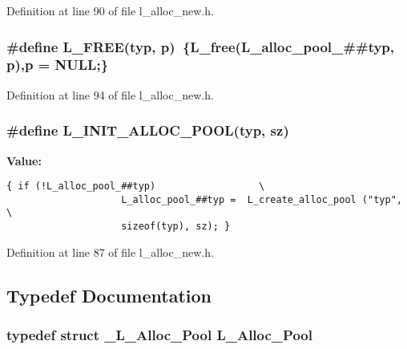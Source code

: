 Definition at line 90 of file l\_\-alloc\_\-new.h.
\subsubsection{\setlength{\rightskip}{0pt plus 5cm}\#define L\_\-FREE(typ, p)~\{L\_\-free(L\_\-alloc\_\-pool\_\-\#\#typ, p),p = NULL;\}}\label{l__alloc__new_8h_4cf4ac7e89ec7a9860e5d0a0a14edae9}




Definition at line 94 of file l\_\-alloc\_\-new.h.
\subsubsection{\setlength{\rightskip}{0pt plus 5cm}\#define L\_\-INIT\_\-ALLOC\_\-POOL(typ, sz)}\label{l__alloc__new_8h_8ad2c6e782598309e0d4b4d4f730d9a8}


\textbf{Value:}

\begin{Code}\begin{verbatim}{ if (!L_alloc_pool_##typ)                  \
                    L_alloc_pool_##typ =  L_create_alloc_pool ("typ",         \
                    sizeof(typ), sz); }
\end{verbatim}\end{Code}


Definition at line 87 of file l\_\-alloc\_\-new.h.

\subsection{Typedef Documentation}
\subsubsection{\setlength{\rightskip}{0pt plus 5cm}typedef struct \bf{\_\-L\_\-Alloc\_\-Pool}
 \bf{L\_\-Alloc\_\-Pool}}\label{l__alloc__new_8h_8b6531fb91f2d9fba3179128e1f9e364}


